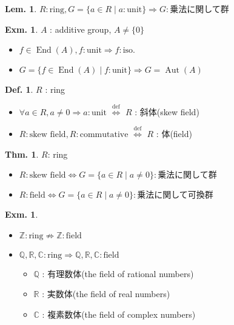 \documentclass[uplatex,dvipdfmx,9pt]{beamer}
\newcommand{\defarrow}{\overset{\mathrm{def}}{\Leftrightarrow}}
\newcommand{\End}[1]{\operatorname{End}(#1)}
\newcommand{\Aut}[1]{\operatorname{Aut}(#1)}
\newcommand{\Z}{\mathbb{Z}}
\newcommand{\Q}{\mathbb{Q}}
\newcommand{\R}{\mathbb{R}}
\newcommand{\C}{\mathbb{C}}
\newcounter{textLemCount}
\newcounter{textExmCount}
\theoremstyle{definition} %
\newtheorem{defn}{Def.}[subsection] %
\newtheorem{thm}{Thm.}[subsection] %
\newtheorem{lemText}[textLemCount]{Lem.} %
\theoremstyle{example}
\newtheorem{exmText}[textExmCount]{Exm.}
\begin{document}
    \begin{frame}

      \begin{lemText}
        $R: \text{ring}, G = \{a \in R \mid a: \text{unit}\} \Rightarrow G: \text{乗法に関して群}$
      \end{lemText}

      \begin{exmText}
        $A$ : additive group, $A \ne \{0\}$
        \begin{itemize}
          \item $f \in \End{A}, f: \text{unit} \Rightarrow f: \text{iso.}$
          \item $G = \{f \in \End{A} \mid f: \text{unit}\} \Rightarrow G = \Aut{A}$
        \end{itemize}
      \end{exmText}

      \begin{defn}
        $R$ : ring
        \begin{itemize}
          \item $\forall a \in R, a \ne 0 \Rightarrow a: \text{unit}$ $\defarrow$ $R$ : \alert{斜体(skew field)}
          \item $R: \text{skew field}, R : \text{commutative}$ $\defarrow$ $R$ : \alert{体(field)}
        \end{itemize}
      \end{defn}

    \end{frame}

    \begin{frame}

      \begin{thm}
        $R$: ring
        \begin{itemize}
          \item $R: \text{skew field} \Leftrightarrow G = \{a \in R \mid a \ne 0\} : \text{乗法に関して群}$
          \item $R: \text{field} \Leftrightarrow G = \{a \in R \mid a \ne 0\} : \text{乗法に関して可換群}$
        \end{itemize}
      \end{thm}
 
      \begin{exmText}
        \begin{itemize}
          \item $\Z : \text{ring} \nRightarrow \Z : \text{field}$
          \item $\Q, \R, \C : \text{ring} \Rightarrow \Q, \R, \C : \text{field}$
          \begin{itemize}
            \item $\Q$ : \alert{有理数体(the field of rational numbers)}
            \item $\R$ : \alert{実数体(the field of real numbers)}
            \item $\C$ : \alert{複素数体(the field of complex numbers)}
          \end{itemize}
        \end{itemize}
      \end{exmText}

    \end{frame}
\end{document}
